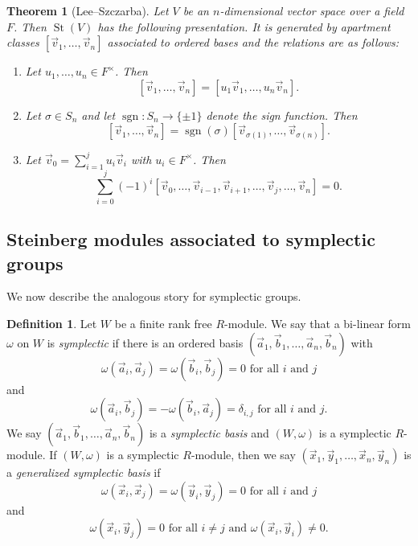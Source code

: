 \documentclass[11pt,letterpaper]{amsart}
\numberwithin{theoremcounter}{section}
\newtheorem{theorem}[theoremauto]{Theorem}
\theoremstyle{definition}
\newtheorem{definition}[Defauto]{Definition}
\theoremstyle{remark}
\DeclareMathOperator*{\sgn}{sgn}
\DeclareMathOperator{\St}{St}
\begin{document}
\begin{theorem}[Lee--Szczarba] \label{GLpres}
Let $V$ be an $n$-dimensional vector space over a field $F$. Then $\St(V)$ has the following presentation. It is  generated by apartment classes $[\vec v_1,\ldots,\vec v_n]$ associated to ordered bases and the relations are as follows:
\begin{enumerate}
   \item Let $u_1,\ldots,u_n \in F^\times$. Then $$[\vec v_1,\ldots,\vec v_n] =[u_1 \vec v_1,\ldots, u_n \vec v_n].$$
     \item Let $\sigma \in S_n$ and let $\sgn\colon S_n \to \{\pm 1\}$ denote the sign function. Then 
     $$[\vec v_1,\ldots,\vec v_n]=\sgn(\sigma) [\vec v_{\sigma(1)},\ldots,\vec v_{\sigma(n)}].$$ 
     \item Let $\vec v_0=\sum_{i=1}^j u_i \vec v_i$ with $u_i \in F^\times$. Then 
     $$\sum_{i=0}^j (-1)^i [\vec v_0,\ldots,\vec v_{i-1},\vec v_{i+1},\ldots,\vec v_j,\ldots,\vec v_n]=0.$$
\end{enumerate}
    
\end{theorem}

\subsection{Steinberg modules associated to symplectic groups}

We now describe the analogous story for symplectic groups. 

\begin{definition}
    Let $W$ be a finite rank free $R$-module. We say that a bi-linear form $\omega$ on $W$ is \emph{symplectic} if there is an ordered basis $(\vec a_1,\vec b_1,\ldots,\vec a_n,\vec b_n)$ with $$\omega(\vec a_i,\vec a_j)=\omega(\vec b_i,\vec b_j)=0 \text{ for all } i \text{ and }j$$ and 
    $$\omega(\vec a_i,\vec b_j)=-\omega(\vec b_i,\vec a_j)=\delta_{i,j} \text{ for all } i \text{ and }j.$$ We say $(\vec a_1,\vec b_1,\ldots,\vec a_n, \vec b_n)$ is a \emph{symplectic basis} and $(W,\omega)$ is a symplectic $R$-module. If $(W,\omega)$ is a symplectic $R$-module, then we say $(\vec x_1,\vec y_1,\ldots,\vec x_n, \vec y_n)$ is a \emph{generalized symplectic basis}  if
    $$\omega(\vec x_i,\vec x_j)=\omega(\vec y_i,\vec y_j)=0 \text{ for all } i \text{ and }j$$ and 
    $$\omega(\vec x_i,\vec y_j)=0 \text{ for all } i \neq j \text{ and } \omega(\vec x_i,\vec y_i)\neq 0.$$ 
\end{definition}
\end{document}

